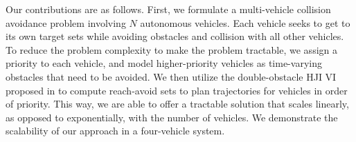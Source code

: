 Our contributions are as follows. First, we formulate a multi-vehicle collision avoidance problem involving $N$ autonomous vehicles. Each vehicle seeks to get to its own target sets while avoiding obstacles and collision with all other vehicles. To reduce the problem complexity to make the problem tractable, we assign a priority to each vehicle, and model higher-priority vehicles as time-varying obstacles that need to be avoided. We then utilize the double-obstacle HJI VI proposed in \cite{fisac15} to compute reach-avoid sets to plan trajectories for vehicles in order of priority. This way, we are able to offer a tractable solution that scales linearly, as opposed to exponentially, with the number of vehicles. We demonstrate the scalability of our approach in a four-vehicle system.